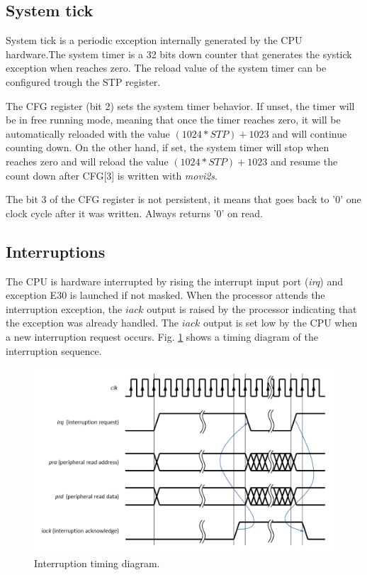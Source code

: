 \subsection{System tick}
\label{ssec:sys_tick}
System tick is a periodic exception internally generated by the CPU hardware.The system timer is a 32 bits down counter that
generates the systick exception when reaches zero. The reload value of the system timer can be configured trough
the STP register.

The CFG register (bit 2) sets the system timer behavior. If unset, the timer will be in free running mode, meaning that
once the timer reaches zero, it will be automatically reloaded with the value $(1024*STP) + 1023$ and will continue counting down.
On the other hand, if set, the system timer will stop when reaches zero and will reload the value $(1024*STP) + 1023$ and
resume the count down after CFG[3] is written with \emph{movi2s}.

The bit 3 of the CFG register is not persistent, it means that goes back to '0' one clock cycle after it was written.
Always returns '0' on read.

\subsection{Interruptions}
The CPU is hardware interrupted by rising the interrupt input port (\emph{irq}) and exception E30 is launched if not masked.
When the processor attends the interruption exception, the $iack$ output is raised by the processor indicating
that the exception was already handled. The $iack$ output is set low by the CPU when a new interruption request occurs. Fig.
\ref{fig:int_sequence} shows a timing diagram of the interruption sequence.

\begin{figure}
\begin{center}
\includegraphics[scale=0.55]{./figures/int_td.png}
\caption{Interruption timing diagram.}
\label{fig:int_sequence}
\end{center}
\end{figure}



